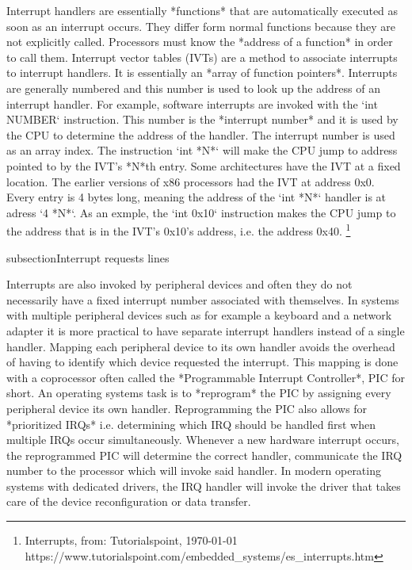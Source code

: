 Interrupt handlers are essentially *functions* that are automatically executed as soon as an
interrupt occurs. They differ form normal functions because they are not explicitly called.
Processors must know the *address of a function* in order to call them. Interrupt vector
tables (IVTs) are a method to associate interrupts to interrupt handlers. It is essentially an
*array of function pointers*. Interrupts are generally numbered and this number is used to look up 
the address of an interrupt handler. For example, software interrupts are invoked with the `int 
\<NUMBER\>` instruction. This number is the *interrupt number* and it is used by the CPU to determine 
the address of the handler. The interrupt number is used as an array index. The instruction `int *N*` 
will make the CPU jump to address pointed to by the IVT's *N*th entry. Some architectures have the IVT
at a fixed location. The earlier versions of x86 processors had the IVT at address 0x0. Every entry
is 4 bytes long, meaning the address of the `int *N*` handler is at adress `4 \* *N*`. As an exmple,
the `int 0x10` instruction makes the CPU jump to the address that is in the IVT's 0x10's address,
i.e. the address 0x40. \footnote{Interrupts, from: Tutorialspoint, \today  \\ https://www.tutorialspoint.com/embedded_systems/es_interrupts.htm}

subsection{Interrupt requests lines}

Interrupts are also invoked by peripheral devices and often they do not necessarily have a fixed 
interrupt number associated with themselves. In systems with multiple peripheral devices such as for 
example a keyboard and a network adapter it is more practical to have separate interrupt handlers
instead of a single handler. Mapping each peripheral device to its own handler avoids the overhead of 
having to identify which device requested the interrupt. This mapping is done with a coprocessor often
called the *Programmable Interrupt Controller*, PIC for short. An operating systems task is to
*reprogram* the PIC by assigning every peripheral device its own handler. Reprogramming the PIC also
allows for *prioritized IRQs* i.e. determining which IRQ should be handled first when multiple IRQs 
occur simultaneously. Whenever a new hardware interrupt occurs, the reprogrammed PIC will determine
the correct handler, communicate the IRQ number to the processor which will invoke said handler. In
modern operating systems with dedicated drivers, the IRQ handler will invoke the driver that takes
care of the device reconfiguration or data transfer.
